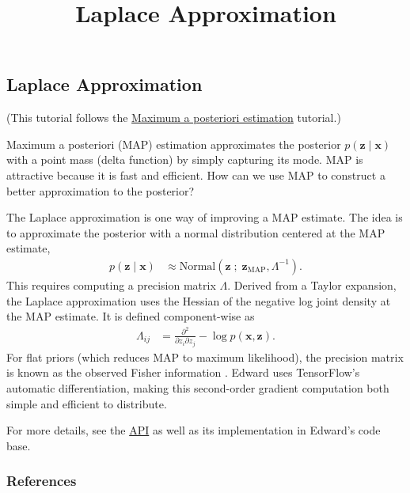 \title{Laplace Approximation}

\subsection{Laplace Approximation}

(This tutorial follows the
\href{/tutorials/map}{Maximum a posteriori estimation} tutorial.)

Maximum a posteriori (MAP) estimation approximates the posterior $p(\mathbf{z} \mid \mathbf{x})$
with a point mass (delta function) by simply capturing its mode. MAP is
attractive because it is fast and efficient. How can we use MAP to construct a
better approximation to the posterior?

The Laplace approximation
\citep{laplace1986memoir}
is one way of improving a MAP estimate. The idea
is to approximate the posterior with a normal distribution centered at the MAP
estimate,
\begin{align*}
  p(\mathbf{z} \mid \mathbf{x})
  &\approx
  \text{Normal}(\mathbf{z}\;;\; \mathbf{z}_\text{MAP}, \Lambda^{-1}).
\end{align*}
This requires computing a precision matrix $\Lambda$. Derived from a
Taylor expansion, the Laplace approximation uses the Hessian of the
negative log joint density at the MAP estimate.
It is defined component-wise as
\begin{align*}
  \Lambda_{ij}
  &=
  \frac{\partial^2}{\partial z_i \partial z_j} -\log p(\mathbf{x}, \mathbf{z}).
\end{align*}
For flat priors (which reduces MAP to maximum likelihood), the
precision matrix is known as the observed Fisher information
\citep{fisher1925theory}.
Edward uses TensorFlow's automatic differentiation, making this
second-order gradient computation both simple and efficient to
distribute.

For more details, see the \href{/api/}{API} as well as its
implementation in Edward's code base.

\subsubsection{References}\label{references}
